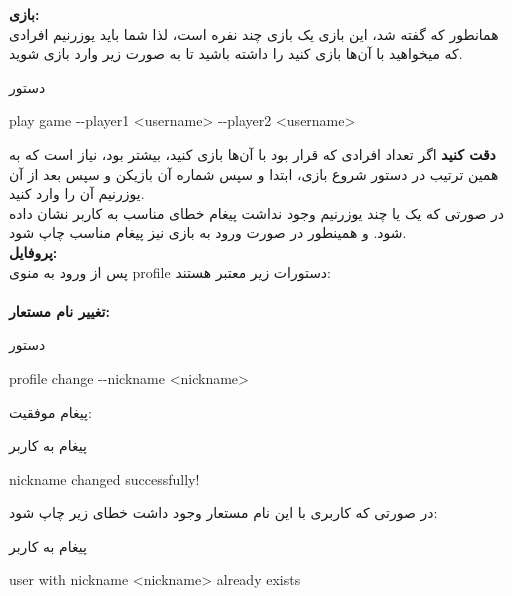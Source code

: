\documentclass[]{article}
\begin{document}
\vspace{.5cm}
\textbf{بازی:}
\\
همانطور که گفته شد، این بازی یک بازی چند نفره است، لذا شما باید یوزرنیم افرادی که میخواهید با آن‌ها بازی کنید را داشته باشید تا به صورت زیر وارد بازی شوید.\\

\begin{mybox}[colback=yellow]{دستور}
	\begin{latin}	
		play game -{}-player1 <username> -{}-player2 <username>
	\end{latin}
\end{mybox}
\newpage
\noindent \textbf{دقت کنید} اگر تعداد افرادی که قرار بود با آن‌ها بازی کنید، بیشتر بود، نیاز است که به همین ترتیب در دستور شروع بازی، ابتدا  و سپس شماره آن بازیکن و سپس بعد از آن یوزرنیم آن را وارد کنید.\\
 در صورتی که یک یا چند یوزرنیم وجود نداشت پیغام خطای مناسب به کاربر نشان داده شود. و همینطور در صورت ورود به بازی نیز پیغام مناسب چاپ شود.\\
\vspace{.5cm}
\textbf{پروفایل:}
\\
پس از ورود به منوی profile دستورات زیر معتبر هستند:
\\
\\
\vspace{.5cm}
\textbf{تغییر نام مستعار:}
\begin{mybox}[colback=yellow]{دستور}
	\begin{latin}	
		profile change -{}-nickname <nickname>
	\end{latin}
\end{mybox}
پیغام موفقیت:
\begin{mybox}[colback=yellow]{پیغام به کاربر}
	\begin{latin}	
		nickname changed successfully!
	\end{latin}
\end{mybox}
در صورتی که کاربری با این نام مستعار وجود داشت خطای زیر چاپ شود:
\begin{mybox}[colback=yellow]{پیغام به کاربر}
	\begin{latin}	
		user with nickname <nickname> already exists
	\end{latin}
\end{mybox}
\end{document}
